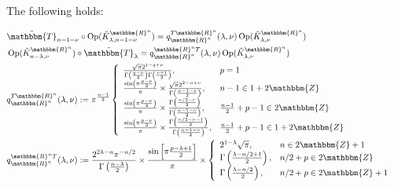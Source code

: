 \documentclass[12pt]{msjproc} %
\newcommand{\assign}{:=}
\newcommand{\tmop}[1]{\ensuremath{\operatorname{#1}}}
\theoremstyle{definition}
\theoremstyle{exampstyle} \newtheorem{examp}[theorem]{Theorem}
\begin{document}
\begin{versiona}
	
The following holds:

\begin{eqnarray}
  & \tilde{\mathbbm{T}}_{n - 1 - \nu} \circ \tmop{Op} (\tilde{K}_{\lambda, n
  - 1 - \nu}^{\mathbbm{R}^n}) = q^{T\mathbbm{R}^n}_{\mathbbm{R}^n} (\lambda,
  \nu) \tmop{Op} (\tilde{K}_{\lambda, \nu}^{\mathbbm{R}^n}) &  \nonumber\\
  & \tmop{Op} (\tilde{K}_{n - \lambda, \nu}^{\mathbbm{R}^n}) \circ
  \tilde{\mathbbm{T}}_{\lambda} = q^{\mathbbm{R}^n T}_{\mathbbm{R}^n}
  (\lambda, \nu) \tmop{Op} (\tilde{K}_{\lambda, \nu}^{\mathbbm{R}^n}) & 
  \nonumber\\
  & q^{T\mathbbm{R}^n}_{\mathbbm{R}^n} (\lambda, \nu) \assign \pi^{\frac{n -
  1}{2}} \left\{ \begin{array}{ll}
    \frac{\sqrt{\pi} 2^{1 - q + \nu}}{\Gamma \left( \frac{q - \nu}{2} \right)
    \Gamma \left( \frac{\nu + 1}{2} \right)}, & p = 1\\
    \frac{\sin \left( \pi \frac{p - \nu}{2} \right)}{\pi} \times
    \frac{\sqrt{\pi} 2^{2 - n + \nu}}{\Gamma \left( \frac{n - 1 - \nu}{2}
    \right)}, & n - 1 \in 1 + 2\mathbbm{Z}\\
    \frac{\sin \left( \pi \frac{p - \nu}{2} \right)}{\pi} \times \frac{\Gamma
    \left( \frac{n / 2 - \nu}{2} \right)}{\Gamma \left( \frac{n - 1 - \nu}{2}
    \right)}, & \frac{n - 1}{2} + p - 1 \in 2\mathbbm{Z}\\
    \frac{\sin \left( \pi \frac{p - \nu}{2} \right)}{\pi} \times \frac{\Gamma
    \left( \frac{n / 2 - \nu - 1}{2} \right)}{\Gamma \left( \frac{n - 1 -
    \nu}{2} \right)}, & \frac{n - 1}{2} + p - 1 \in 1 + 2\mathbbm{Z}
  \end{array} \right. &  \nonumber\\
  & q^{\mathbbm{R}^n T}_{\mathbbm{R}^n} (\lambda, \nu) \assign \frac{2^{2
  \lambda - n} \pi^{- n / 2}}{\Gamma \left( \frac{n - \lambda}{2} \right)}
  \times \frac{\sin \left[ \pi \frac{p - \lambda + 1}{2} \right]}{\pi} \times
  \left\{ \begin{array}{ll}
    2^{1 - \lambda} \sqrt{\pi}, & n \in 2\mathbbm{Z}+ 1\\
    \Gamma \left( \frac{\lambda - n / 2 + 1}{2} \right), & n / 2 + p \in
    2\mathbbm{Z}\\
    \Gamma \left( \frac{\lambda - n / 2}{2} \right), & n / 2 + p \in
    2\mathbbm{Z}+ 1
  \end{array} \right. &  \nonumber
\end{eqnarray}
\end{versiona}
\end{document}
